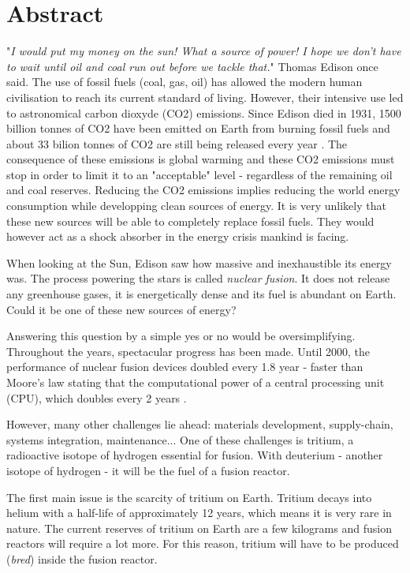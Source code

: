 \chapter*{Abstract}

"\textit{I would put my money on the sun! What a source of power! I hope we don't have to wait until oil and coal run out before we tackle that.}" Thomas Edison once said.
The use of fossil fuels (coal, gas, oil) has allowed the modern human civilisation to reach its current standard of living.
However, their intensive use led to astronomical carbon dioxyde (CO2) emissions.
Since Edison died in 1931, 1500 billion tonnes of CO2 have been emitted on Earth from burning fossil fuels and about 33 bilion tonnes of CO2 are still being released every year \cite{friedlingstein_global_2021}.
The consequence of these emissions is global warming and these CO2 emissions must stop in order to limit it to an "acceptable" level - regardless of the remaining oil and coal reserves.
Reducing the CO2 emissions implies reducing the world energy consumption while developping clean sources of energy.
It is very unlikely that these new sources will be able to completely replace fossil fuels.
They would however act as a shock absorber in the energy crisis mankind is facing.

When looking at the Sun, Edison saw how massive and inexhaustible its energy was.
The process powering the stars is called \textit{nuclear fusion}.
It does not release any greenhouse gases, it is energetically dense and its fuel is abundant on Earth.
Could it be one of these new sources of energy?

Answering this question by a simple yes or no would be oversimplifying.
Throughout the years, spectacular progress has been made.
Until 2000, the performance of nuclear fusion devices doubled every 1.8 year - faster than Moore's law stating that the computational power of a central processing unit (CPU), which doubles every 2 years \cite{webster_fusion_2003}.

However, many other challenges lie ahead: materials development, supply-chain, systems integration, maintenance...
One of these challenges is tritium, a radioactive isotope of hydrogen essential for fusion.
With deuterium - another isotope of hydrogen - it will be the fuel of a fusion reactor.

The first main issue is the scarcity of tritium on Earth.
Tritium decays into helium with a half-life of approximately 12 years, which means it is very rare in nature.
The current reserves of tritium on Earth are a few kilograms and fusion reactors will require a lot more.
For this reason, tritium will have to be produced (\textit{bred}) inside the fusion reactor.

